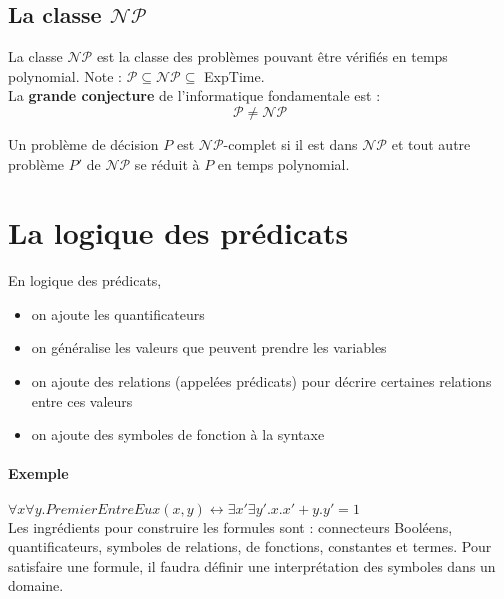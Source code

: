 \documentclass[a4paper]{article}
\begin{document}
  \subsection{La classe $\mathcal{N}\mathcal{P}$}
  La classe $\mathcal{N}\mathcal{P}$ est la classe des problèmes pouvant être vérifiés
  en temps polynomial. Note : $\mathcal{P} \subseteq \mathcal{N}\mathcal{P} \subseteq$ ExpTime.\\

  La \textbf{grande conjecture} de l'informatique fondamentale est :
  $$ \mathcal{P} \neq \mathcal{N}\mathcal{P} $$

  Un problème de décision $P$ est $\mathcal{N}\mathcal{P}$-complet si il est dans
  $\mathcal{N}\mathcal{P}$ et tout autre problème $P'$ de $\mathcal{N}\mathcal{P}$
  se réduit à $P$ en temps polynomial.


\section{La logique des prédicats}
  En logique des prédicats,
  \begin{itemize}
    \item on ajoute les quantificateurs
    \item on généralise les valeurs que peuvent prendre les variables
    \item on ajoute des relations (appelées prédicats) pour décrire certaines
    relations entre ces valeurs
    \item on ajoute des symboles de fonction à la syntaxe
  \end{itemize}

  \paragraph{Exemple} $\forall x\forall y . PremierEntreEux(x,y) \leftrightarrow \exists x' \exists y' . x.x'+y.y' = 1$\\

  Les ingrédients pour construire les formules sont : connecteurs Booléens,
  quantificateurs, symboles de relations, de fonctions, constantes et termes. Pour
  satisfaire une formule, il faudra définir une interprétation des symboles dans un domaine.
\end{document}
